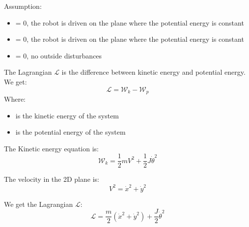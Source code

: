 Assumption:
\begin{itemize}
	\item { = 0, the robot is driven on the plane where the potential energy is constant}
	\item { = 0, the robot is driven on the plane where the potential energy is constant}
	\item { = 0, no outside disturbances}
	
\end{itemize}

The Lagrangian \(\mathcal{L}\) is the difference between kinetic energy and potential energy. We get:
\begin{equation}
\mathcal{L} = \mathcal{W}_k - \mathcal{W}_p 
\end{equation}
Where:
\begin{itemize}
	\item { is the kinetic energy of the system}
	\item { is the potential energy of the system}
	
\end{itemize}

The Kinetic energy equation is:
\begin{equation}
\mathcal{W}_k = \frac{1}{2}mV^2 + \frac{1}{2} J\Dot{\theta}^2
\end{equation}

The velocity in the 2D plane is:
\begin{equation}
V^2 = \Dot{x}^2 + \Dot{y}^2
\end{equation}

We get the Lagrangian \(\mathcal{L}\):
\begin{equation}
\mathcal{L} = \frac{m}{2}(\Dot{x}^2 + \Dot{y}^2) + \frac{J}{2}\Dot{\theta}^2
\end{equation}

